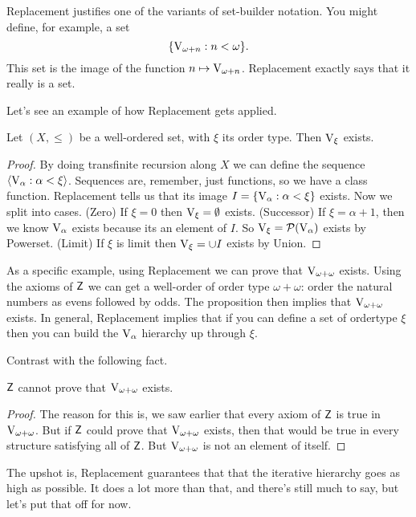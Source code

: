 \documentclass[10pt]{amsart}
\begin{document}
Replacement justifies one of the variants of set-builder notation. You might define, for example, a set
\[
\{ \mathrm{V}_{\omega + n} : n < \omega \}.
\]
This set is the image of the function $n \mapsto \mathrm{V}_{\omega + n}$. Replacement exactly says that it really is a set.

Let's see an example of how Replacement gets applied.

\begin{proposition}
Let $(X,\le)$ be a well-ordered set, with $\xi$ its order type. Then $\mathrm{V}_\xi$ exists.
\end{proposition}

\begin{proof}
By doing transfinite recursion along $X$ we can define the sequence ${\left\langle \mathrm{V}_\alpha : \alpha < \xi \right\rangle}$. Sequences are, remember, just functions, so we have a class function. Replacement tells us that its image $I = \{ \mathrm{V}_\alpha : \alpha < \xi \}$ exists. Now we split into cases. (Zero) If $\xi = 0$ then $\mathrm{V}_\xi = \emptyset$ exists. (Successor) If $\xi = \alpha + 1$, then we know $\mathrm{V}_\alpha$ exists because its an element of $I$. So $\mathrm{V}_\xi = \mathcal{P}(\mathrm{V}_\alpha)$ exists by Powerset. (Limit) If $\xi$ is limit then $\mathrm{V}_\xi = \cup I$ exists by Union.
\end{proof}

As a specific example, using Replacement we can prove that $\mathrm{V}_{\omega + \omega}$ exists. Using the axioms of $\mathsf{Z}$ we can get a well-order of order type $\omega + \omega$: order the natural numbers as evens followed by odds. The proposition then implies that $\mathrm{V}_{\omega + \omega}$ exists. In general, Replacement implies that if you can define a set of ordertype $\xi$ then you can build the $\mathrm{V}_\alpha$ hierarchy up through $\xi$.

Contrast with the following fact.

\begin{observation}
$\mathsf{Z}$ cannot prove that $\mathrm{V}_{\omega + \omega}$ exists.
\end{observation}

\begin{proof}
The reason for this is, we saw earlier that every axiom of $\mathsf{Z}$ is true in $\mathrm{V}_{\omega + \omega}$. But if $\mathsf{Z}$ could prove that $\mathrm{V}_{\omega + \omega}$ exists, then that would be true in every structure satisfying all of $\mathsf{Z}$. But $\mathrm{V}_{\omega +\omega}$ is not an element of itself. 
\end{proof}

The upshot is, Replacement guarantees that that the iterative hierarchy goes as high as possible. It does a lot more than that, and there's still much to say, but let's put that off for now.
\smallskip
\end{document}
